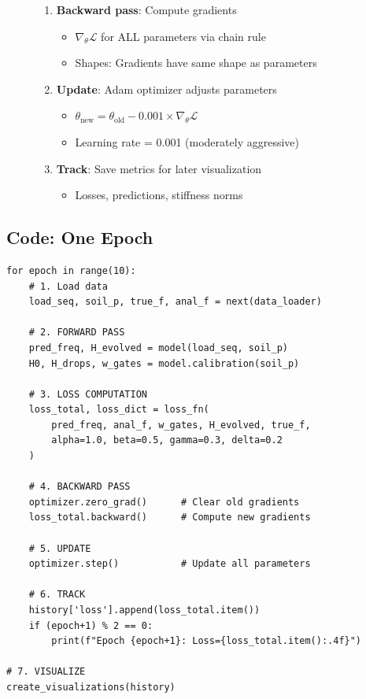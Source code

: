 \documentclass[11pt,a4paper]{article}
\begin{document}
\begin{figure}[H]
{\begin{minipage}{0.95\textwidth}
\begin{enumerate}
  \item \textbf{Backward pass}: Compute gradients
  \begin{itemize}
    \item $\nabla_\theta \mathcal{L}$ for ALL parameters via chain rule
    \item Shapes: Gradients have same shape as parameters
  \end{itemize}

  \item \textbf{Update}: Adam optimizer adjusts parameters
  \begin{itemize}
    \item $\theta_{\text{new}} = \theta_{\text{old}} - 0.001 \times \nabla_\theta \mathcal{L}$
    \item Learning rate = 0.001 (moderately aggressive)
  \end{itemize}

  \item \textbf{Track}: Save metrics for later visualization
  \begin{itemize}
    \item Losses, predictions, stiffness norms
  \end{itemize}
\end{enumerate}
\end{minipage}}
\end{figure}

\subsection{Code: One Epoch}

\begin{lstlisting}[caption=Single Training Epoch]
for epoch in range(10):
    # 1. Load data
    load_seq, soil_p, true_f, anal_f = next(data_loader)

    # 2. FORWARD PASS
    pred_freq, H_evolved = model(load_seq, soil_p)
    H0, H_drops, w_gates = model.calibration(soil_p)

    # 3. LOSS COMPUTATION
    loss_total, loss_dict = loss_fn(
        pred_freq, anal_f, w_gates, H_evolved, true_f,
        alpha=1.0, beta=0.5, gamma=0.3, delta=0.2
    )

    # 4. BACKWARD PASS
    optimizer.zero_grad()      # Clear old gradients
    loss_total.backward()      # Compute new gradients

    # 5. UPDATE
    optimizer.step()           # Update all parameters

    # 6. TRACK
    history['loss'].append(loss_total.item())
    if (epoch+1) % 2 == 0:
        print(f"Epoch {epoch+1}: Loss={loss_total.item():.4f}")

# 7. VISUALIZE
create_visualizations(history)
\end{lstlisting}
\end{document}
